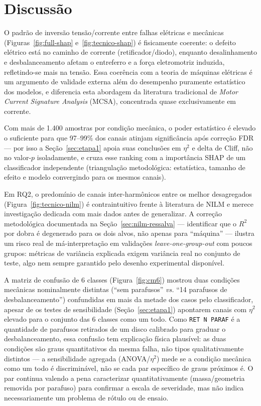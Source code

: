 \documentclass[12pt,a4paper]{report}
\begin{document}
\chapter{Discussão}

O padrão de inversão tensão/corrente entre falhas elétricas e mecânicas
(Figuras~\ref{fig:full-shap} e~\ref{fig:tecnico-shap}) é fisicamente
coerente: o defeito elétrico está no caminho de corrente (retificador/diodo),
enquanto desalinhamento e desbalanceamento afetam o entreferro e a força
eletromotriz induzida, refletindo-se mais na tensão. Essa coerência com a
teoria de máquinas elétricas é um argumento de validade externa além do
desempenho puramente estatístico dos modelos, e diferencia esta abordagem da
literatura tradicional de \emph{Motor Current Signature Analysis} (MCSA),
concentrada quase exclusivamente em corrente.

Com mais de 1.400 amostras por condição mecânica, o poder estatístico é
elevado o suficiente para que 97--99\% dos canais atinjam significância após
correção FDR — por isso a Seção~\ref{sec:etapa1} apoia suas conclusões em
$\eta^2$ e delta de Cliff, não no valor-$p$ isoladamente, e cruza esse
ranking com a importância SHAP de um classificador independente
(triangulação metodológica: estatística, tamanho de efeito e modelo
convergindo para os mesmos canais).

Em RQ2, o predomínio de canais inter-harmônicos entre os melhor desagregados
(Figura~\ref{fig:tecnico-nilm}) é contraintuitivo frente à literatura de
NILM e merece investigação dedicada com mais dados antes de generalizar. A
correção metodológica documentada na Seção~\ref{sec:nilm-ressalva} —
identificar que o $R^2$ por dobra é degenerado para os dois alvos, não
apenas para ``máquina'' — ilustra um risco real de má-interpretação em
validações \emph{leave-one-group-out} com poucos grupos: métricas de
variância explicada exigem variância real no conjunto de teste, algo nem
sempre garantido pelo desenho experimental disponível.

A matriz de confusão de 6 classes (Figura~\ref{fig:cm6}) mostrou duas
condições mecânicas nominalmente distintas (``sem parafusos'' \emph{vs.}
``14 parafusos de desbalanceamento'') confundidas em mais da metade dos
casos pelo classificador, apesar de os testes de sensibilidade
(Seção~\ref{sec:etapa1}) apontarem canais com $\eta^2$ elevado para o
conjunto das 6 classes como um todo. Como \texttt{RET~N~PARAF} é a
quantidade de parafusos retirados de um disco calibrado para graduar o
desbalanceamento, essa confusão tem explicação física plausível: as duas
condições são graus quantitativos da mesma falha, não tipos qualitativamente
distintos — a sensibilidade agregada (ANOVA/$\eta^2$) mede se a condição
mecânica como um todo é discriminável, não se cada par específico de graus
próximos é. O par continua valendo a pena caracterizar quantitativamente
(massa/geometria removida por parafuso) para confirmar a escala de
severidade, mas não indica necessariamente um problema de rótulo ou de
ensaio.
\end{document}
